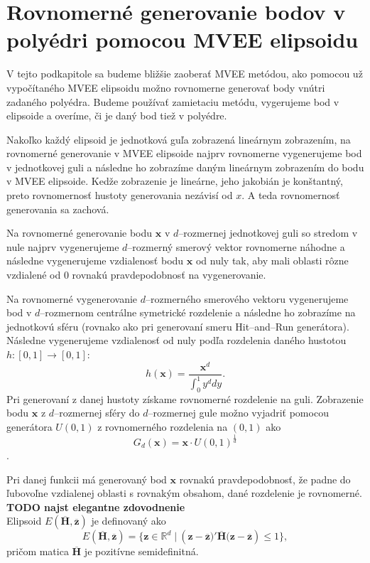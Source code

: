 \section {Rovnomerné generovanie bodov v polyédri pomocou MVEE elipsoidu}

V tejto podkapitole sa budeme bližšie zaoberať MVEE metódou, ako pomocou už vypočítaného MVEE elipsoidu možno rovnomerne generovať body vnútri zadaného polyédra. Budeme používať zamietaciu metódu, vygerujeme bod v elipsoide a overíme, či je daný bod tiež v polyédre.

Nakoľko každý elipsoid je jednotková guľa zobrazená lineárnym zobrazením, na rovnomerné generovanie v MVEE elipsoide najprv rovnomerne vygenerujeme bod v jednotkovej guli a následne ho zobrazíme daným lineárnym zobrazením do bodu v MVEE elipsoide. Kedže zobrazenie je lineárne, jeho jakobián je konštantný, preto rovnomernosť hustoty generovania nezávisí od $x$. A teda rovnomernosť generovania sa zachová.\\
\label{generovanie_v_mvee}

Na rovnomerné generovanie bodu $\mathbf x$ v $d$--rozmernej jednotkovej guli so stredom v nule najprv vygenerujeme $d$--rozmerný smerový vektor rovnomerne náhodne a následne vygenerujeme vzdialenosť bodu $\mathbf x$ od nuly tak, aby mali oblasti rôzne vzdialené od $0$ rovnakú pravdepodobnosť na vygenerovanie.

Na rovnomerné vygenerovanie $d$--rozmerného smerového vektoru vygenerujeme bod v $d$--rozmernom centrálne symetrické rozdelenie a následne ho zobrazíme na jednotkovú sféru (rovnako ako pri generovaní smeru Hit--and--Run generátora). Následne vygenerujeme vzdialenosť od nuly podľa rozdelenia daného hustotou $h:[0,1] \rightarrow [0,1]$: $$h(\mathbf x)=\frac{\mathbf x^d}{\int_0^1 y^d dy}.$$
Pri generovaní z danej hustoty získame rovnomerné rozdelenie na guli. Zobrazenie bodu $\mathbf x$ z $d$--rozmernej sféry do $d$--rozmernej gule možno vyjadriť pomocou generátora $U(0,1)$ z rovnomerného rozdelenia na $(0,1)$ ako 
$$G_d(\mathbf x)=\mathbf x\cdot U(0,1)^{\frac{1}{d}}$$.

Pri danej funkcii má generovaný bod $\mathbf x$ rovnakú pravdepodobnosť, že padne do ľubovoľne vzdialenej oblasti s rovnakým obsahom, dané rozdelenie je rovnomerné. \textbf{TODO najst elegantne zdovodnenie}\\

Elipsoid $E(\mathbf{\overline H, \overline z})$ je definovaný ako 
$$E(\mathbf{\overline H, \overline z})= \{ \mathbf{z} \in \mathbb{R}^d \; | \: (\mathbf{z-\overline z)'\overline H(z-\overline z}) \le 1 \}, $$
pričom matica $\mathbf{\overline H}$ je pozitívne semidefinitná.


